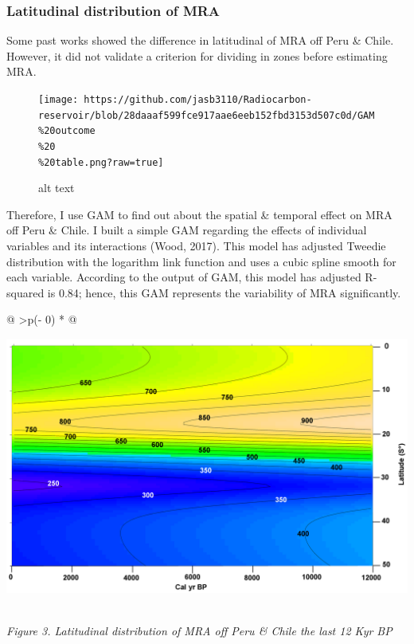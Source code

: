 \documentclass[
]{article}
\begin{document}
\hypertarget{latitudinal-distribution-of-mra}{%
\subsubsection{Latitudinal distribution of
MRA}\label{latitudinal-distribution-of-mra}}

Some past works showed the difference in latitudinal of MRA off Peru \&
Chile. However, it did not validate a criterion for dividing in zones
before estimating MRA.

\begin{figure}
\centering
\texttt{[image: https://github.com/jasb3110/Radiocarbon-reservoir/blob/28daaaf599fce917aae6eeb152fbd3153d507c0d/GAM\\\%20outcome\\\%20\\\%20table.png?raw=true]}
\caption{alt text}
\end{figure}

Therefore, I use GAM to find out about the spatial \& temporal effect on
MRA off Peru \& Chile. I built a simple GAM regarding the effects of
individual variables and its interactions (Wood, 2017). This model has
adjusted Tweedie distribution with the logarithm link function and uses
a cubic spline smooth for each variable. According to the output of GAM,
this model has adjusted R-squared is 0.84; hence, this GAM represents
the variability of MRA significantly.

\begin{longtable}[]{@{}
  >{\centering\arraybackslash}p{(\columnwidth - 0\tabcolsep) * }@{}}
\toprule
\begin{minipage}[b]{\linewidth}\centering
\href{https://github.com/jasb3110/Radiocarbon-reservoir/blob/5c906b5d15b85dd72416e0abd3e72d53126c9b7b/GAM\%20radiocarbon\%20heat\%20map.png}{\includegraphics{GAM radiocarbon heat map.png}}
\end{minipage} \\
\midrule
\endhead
\emph{Figure 3. Latitudinal distribution of MRA off Peru \& Chile the
last 12 Kyr BP} \\
\bottomrule
\end{longtable}
\end{document}
